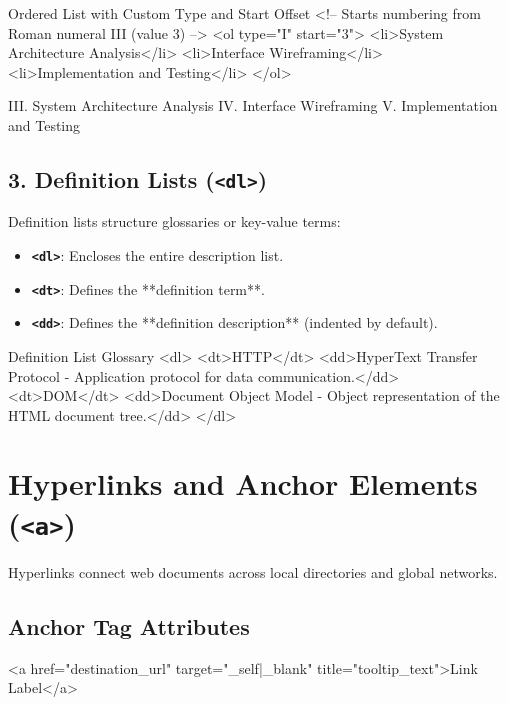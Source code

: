 \begin{htmlcode}{Ordered List with Custom Type and Start Offset}
<!-- Starts numbering from Roman numeral III (value 3) -->
<ol type="I" start="3">
    <li>System Architecture Analysis</li>
    <li>Interface Wireframing</li>
    <li>Implementation and Testing</li>
</ol>
\end{htmlcode}

\begin{outputbox}
III. System Architecture Analysis
IV. Interface Wireframing
V. Implementation and Testing
\end{outputbox}

\subsection{3. Definition Lists (\texttt{<dl>})}
Definition lists structure glossaries or key-value terms:
\begin{itemize}[leftmargin=1.5em]
    \item \textbf{\texttt{<dl>}}: Encloses the entire description list.
    \item \textbf{\texttt{<dt>}}: Defines the **definition term**.
    \item \textbf{\texttt{<dd>}}: Defines the **definition description** (indented by default).
\end{itemize}

\begin{htmlcode}{Definition List Glossary}
<dl>
    <dt>HTTP</dt>
    <dd>HyperText Transfer Protocol - Application protocol for data communication.</dd>
    <dt>DOM</dt>
    <dd>Document Object Model - Object representation of the HTML document tree.</dd>
</dl>
\end{htmlcode}

\section{Hyperlinks and Anchor Elements (\texttt{<a>})}

Hyperlinks connect web documents across local directories and global networks.

\subsection{Anchor Tag Attributes}
\begin{syntaxbox}
<a href="destination\_url" target="\_self|\_blank" title="tooltip\_text">Link Label</a>
\end{syntaxbox}


